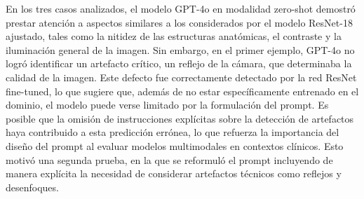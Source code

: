 En los tres casos analizados, el modelo GPT-4o en modalidad zero-shot demostró prestar atención a aspectos similares a los considerados por el modelo ResNet-18 ajustado, tales como la nitidez de las estructuras anatómicas, el contraste y la iluminación general de la imagen. Sin embargo, en el primer ejemplo, GPT-4o no logró identificar un artefacto crítico, un reflejo de la cámara, que determinaba la calidad de la imagen. Este defecto fue correctamente detectado por la red ResNet fine-tuned, lo que sugiere que, además de no estar específicamente entrenado en el dominio, el modelo puede verse limitado por la formulación del prompt. Es posible que la omisión de instrucciones explícitas sobre la detección de artefactos haya contribuido a esta predicción errónea, lo que refuerza la importancia del diseño del prompt al evaluar modelos multimodales en contextos clínicos. Esto motivó una segunda prueba, en la que se reformuló el prompt incluyendo de manera explícita la necesidad de considerar artefactos técnicos como reflejos y desenfoques.

\begin{table}[H]
	\renewcommand{\arraystretch}{5}
	\caption{Prompt usado para clasificación e interpretación zero-shot con GPT-4o, incluyendo en el prompt la necesidad de considerar artefactos.}
	\label{tab:promtZeroShotExplicacionArtefactos}
\end{table}

